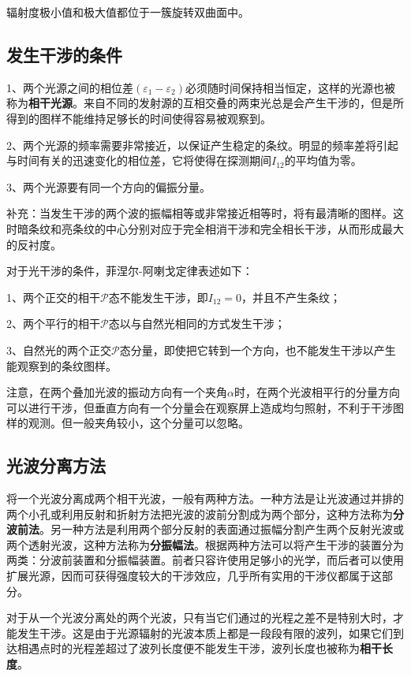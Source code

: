 \documentclass[UTF8]{ctexart}
\begin{document}
	辐射度极小值和极大值都位于一簇旋转双曲面中。

	\subsection{发生干涉的条件}
	1、两个光源之间的相位差$(\varepsilon_{1}-\varepsilon_{2})$必须随时间保持相当恒定，这样的光源也被称为\textbf{相干光源}。来自不同的发射源的互相交叠的两束光总是会产生干涉的，但是所得到的图样不能维持足够长的时间使得容易被观察到。

	2、两个光源的频率需要非常接近，以保证产生稳定的条纹。明显的频率差将引起与时间有关的迅速变化的相位差，它将使得在探测期间$I_{12}$的平均值为零。

	3、两个光源要有同一个方向的偏振分量。

	补充：当发生干涉的两个波的振幅相等或非常接近相等时，将有最清晰的图样。这时暗条纹和亮条纹的中心分别对应于完全相消干涉和完全相长干涉，从而形成最大的反衬度。

	对于光干涉的条件，菲涅尔-阿喇戈定律表述如下：

	1、两个正交的相干$\mathscr{P}$态不能发生干涉，即$I_{12}=0$，并且不产生条纹；

	2、两个平行的相干$\mathscr{P}$态以与自然光相同的方式发生干涉；

	3、自然光的两个正交$\mathscr{P}$态分量，即使把它转到一个方向，也不能发生干涉以产生能观察到的条纹图样。
	
	注意，在两个叠加光波的振动方向有一个夹角$ \alpha $时，在两个光波相平行的分量方向可以进行干涉，但垂直方向有一个分量会在观察屏上造成均匀照射，不利于干涉图样的观测。但一般夹角较小，这个分量可以忽略。
	
	\subsection{光波分离方法}
	将一个光波分离成两个相干光波，一般有两种方法。一种方法是让光波通过并排的两个小孔或利用反射和折射方法把光波的波前分割成为两个部分，这种方法称为\textbf{分波前法}。另一种方法是利用两个部分反射的表面通过振幅分割产生两个反射光波或两个透射光波，这种方法称为\textbf{分振幅法}。根据两种方法可以将产生干涉的装置分为两类：分波前装置和分振幅装置。前者只容许使用足够小的光学，而后者可以使用扩展光源，因而可获得强度较大的干涉效应，几乎所有实用的干涉仪都属于这部分。
	
	对于从一个光波分离处的两个光波，只有当它们通过的光程之差不是特别大时，才能发生干涉。这是由于光源辐射的光波本质上都是一段段有限的波列，如果它们到达相遇点时的光程差超过了波列长度便不能发生干涉，波列长度也被称为\textbf{相干长度}。
	
\end{document}
